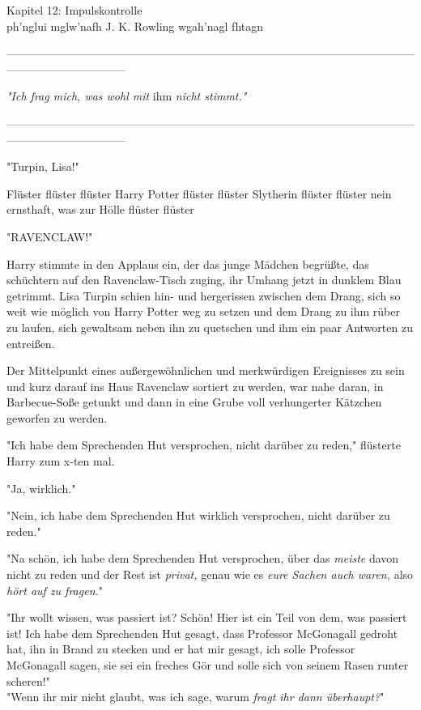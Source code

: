 

\hypertarget{impulskontrolle}{%

Kapitel 12: Impulskontrolle\\

ph'nglui mglw'nafh J. K. Rowling wgah'nagl fhtagn

--------------------------------------------------------------------------------------------------------------------------------------------

\emph{"Ich frag mich, was wohl mit} ihm \emph{nicht stimmt."}

--------------------------------------------------------------------------------------------------------------------------------------------

"Turpin, Lisa!"

Flüster flüster flüster Harry Potter flüster flüster Slytherin flüster flüster nein ernsthaft, was zur Hölle flüster flüster

"RAVENCLAW!"

Harry stimmte in den Applaus ein, der das junge Mädchen begrüßte, das schüchtern auf den Ravenclaw-Tisch zuging, ihr Umhang jetzt in dunklem Blau getrimmt. Lisa Turpin schien hin- und hergerissen zwischen dem Drang, sich so weit wie möglich von Harry Potter weg zu setzen und dem Drang zu ihm rüber zu laufen, sich gewaltsam neben ihn zu quetschen und ihm ein paar Antworten zu entreißen.

Der Mittelpunkt eines außergewöhnlichen und merkwürdigen Ereignisses zu sein und kurz darauf ins Haus Ravenclaw sortiert zu werden, war nahe daran, in Barbecue-Soße getunkt und dann in eine Grube voll verhungerter Kätzchen geworfen zu werden.

"Ich habe dem Sprechenden Hut versprochen, nicht darüber zu reden," flüsterte Harry zum x-ten mal.

"Ja, wirklich."

"Nein, ich habe dem Sprechenden Hut wirklich versprochen, nicht darüber zu reden."

"Na schön, ich habe dem Sprechenden Hut versprochen, über das \emph{meiste} davon nicht zu reden und der Rest ist \emph{privat,} genau wie es \emph{eure Sachen auch waren,} also \emph{hört auf zu fragen.}"

"Ihr wollt wissen, was passiert ist? Schön! Hier ist ein Teil von dem, was passiert ist! Ich habe dem Sprechenden Hut gesagt, dass Professor McGonagall gedroht hat, ihn in Brand zu stecken und er hat mir gesagt, ich solle Professor McGonagall sagen, sie sei ein freches Gör und solle sich von seinem Rasen runter scheren!"\\ "Wenn ihr mir nicht glaubt, was ich sage, warum \emph{fragt ihr dann überhaupt?}"

}
